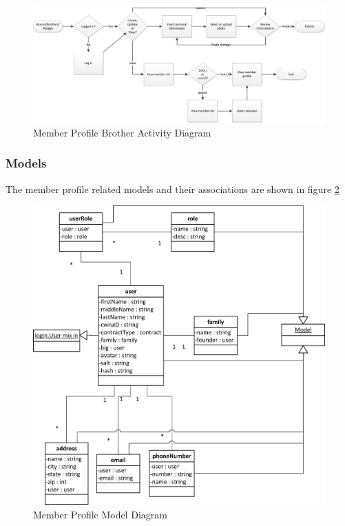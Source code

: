 \documentclass{article}
\begin{document}
\FloatBarrier
\begin{figure}
\centering
\includegraphics[scale=.65]{img/activityDiagrams/memberProfileActivity2}
\caption{Member Profile Brother Activity Diagram}
\label{fig:memberProfileBrotherActivityDiagram}
\end{figure}
\FloatBarrier

\subsubsection{Models}

The member profile related models and their associations are shown in figure \ref{fig:memberProfileModelDiagram}

\FloatBarrier
\begin{figure}[h!]
\centering
\includegraphics[scale=.65]{img/modelDiagrams/userModel}
\caption{Member Profile Model Diagram}
\label{fig:memberProfileModelDiagram}
\end{figure}
\FloatBarrier
\end{document}
